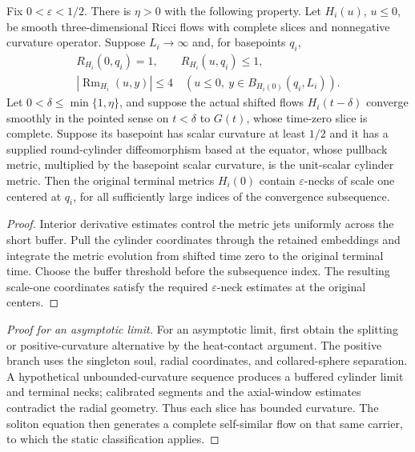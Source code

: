 \begin{lemma}
\label{lem:ancient-terminal-cylinder}
Fix $0<\varepsilon<1/2$.  There is $\eta>0$ with the following
property. Let $H_i(u)$, $u\leq0$, be smooth three-dimensional
Ricci flows with complete slices and nonnegative curvature operator.
Suppose $L_i\to\infty$
and, for basepoints $q_i$,
\[
 \begin{gathered}
 R_{H_i}(0,q_i)=1,\qquad R_{H_i}(u,q_i)\leq1,\\
 |\operatorname{Rm}_{H_i}(u,y)|\leq4\quad
 (u\leq0,\ y\in B_{H_i(0)}(q_i,L_i)).
 \end{gathered}
\]
Let $0<\delta\leq\min\{1,\eta\}$, and suppose the actual shifted flows
$H_i(t-\delta)$ converge smoothly in the pointed sense on $t<\delta$
to $G(t)$, whose time-zero slice is complete.
Suppose its basepoint has scalar curvature at least $1/2$ and it has
a supplied round-cylinder diffeomorphism based at the equator, whose
pullback metric, multiplied by the basepoint scalar curvature, is the
unit-scalar cylinder metric. Then the original
terminal metrics $H_i(0)$ contain $\varepsilon$-necks of scale one
centered at $q_i$, for all sufficiently large indices of the
convergence subsequence.
\end{lemma}
\begin{proof}
Interior derivative estimates control the metric jets uniformly across the
short buffer. Pull the cylinder coordinates through the retained embeddings
and integrate the metric evolution from shifted time zero to the original
terminal time. Choose the buffer threshold before the subsequence index. The
resulting scale-one coordinates satisfy the required $\varepsilon$-neck
estimates at the original centers.
\end{proof}

\begin{proof}[Proof for an asymptotic limit]
For an asymptotic limit, first obtain the splitting or positive-curvature
alternative by the heat-contact argument. The positive branch uses the
singleton soul, radial coordinates, and collared-sphere separation. A
hypothetical unbounded-curvature sequence produces a buffered cylinder limit
and terminal necks; calibrated segments and the axial-window estimates
contradict the radial geometry. Thus each slice has bounded curvature. The
soliton equation then generates a complete self-similar flow on that same
carrier, to which the static classification applies.
\end{proof}

